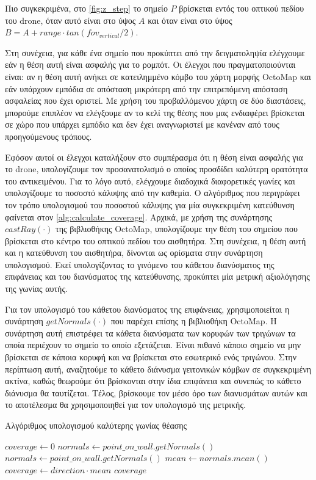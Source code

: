 Πιο συγκεκριμένα, στο \autoref{fig:z_step} το σημείο $P$ βρίσκεται εντός του οπτικού πεδίου του drone, όταν αυτό είναι στο ύψος $A$ και όταν είναι στο ύψος $B = A + range \cdot tan(fov_{vertical}/2)$. 

Στη συνέχεια, για κάθε ένα σημείο που προκύπτει από την δειγματοληψία ελέγχουμε εάν η θέση αυτή είναι ασφαλής για το ρομπότ. Οι έλεγχοι που πραγματοποιούνται είναι: αν η θέση αυτή ανήκει σε κατειλημμένο κόμβο του χάρτη μορφής OctoMap και εάν υπάρχουν εμπόδια σε απόσταση μικρότερη από την επιτρεπόμενη απόσταση ασφαλείας που έχει οριστεί. Με χρήση του προβαλλόμενου χάρτη σε δύο διαστάσεις, μπορούμε επιπλέον να ελέγξουμε αν το κελί της θέσης που μας ενδιαφέρει βρίσκεται σε χώρο που υπάρχει εμπόδιο και δεν έχει αναγνωριστεί με κανέναν από τους προηγούμενους τρόπους.

Εφόσον αυτοί οι έλεγχοι καταλήξουν στο συμπέρασμα ότι η θέση είναι ασφαλής για το drone, υπολογίζουμε τον προσανατολισμό ο οποίος προσδίδει καλύτερη ορατότητα του αντικειμένου. Για το λόγο αυτό, ελέγχουμε διαδοχικά διαφορετικές γωνίες και υπολογίζουμε το ποσοστό κάλυψης από την καθεμία. Ο αλγόριθμος που περιγράφει τον τρόπο υπολογισμού του ποσοστού κάλυψης για μία συγκεκριμένη κατεύθυνση φαίνεται στον \autoref{alg:calculate_coverage}. Αρχικά, με χρήση της συνάρτησης $castRay(\cdot)$ της βιβλιοθήκης OctoMap, υπολογίζουμε την θέση του σημείου που βρίσκεται στο κέντρο του οπτικού πεδίου του αισθητήρα. Στη συνέχεια, η θέση αυτή και η κατεύθυνση του αισθητήρα, δίνονται ως ορίσματα στην συνάρτηση υπολογισμού. Εκεί υπολογίζοντας το γινόμενο του κάθετου διανύσματος της επιφάνειας και του διανύσματος της κατεύθυνσης, προκύπτει μία μετρική αξιολόγησης της γωνίας αυτής. 

Για τον υπολογισμό του κάθετου διανύσματος της επιφάνειας, χρησιμοποιείται η συνάρτηση $getNormals(\cdot)$ που παρέχει επίσης η βιβλιοθήκη OctoMap. Η συνάρτηση αυτή επιστρέφει τα κάθετα διανύσματα των κορυφών των τριγώνων τα οποία περιέχουν το σημείο το οποίο εξετάζεται. Είναι πιθανό κάποιο σημείο να μην βρίσκεται σε κάποια κορυφή και να βρίσκεται στο εσωτερικό ενός τριγώνου. Στην περίπτωση αυτή, αναζητούμε το κάθετο διάνυσμα γειτονικών κόμβων σε συγκεκριμένη ακτίνα, καθώς θεωρούμε ότι βρίσκονται στην ίδια επιφάνεια και συνεπώς το κάθετο διάνυσμα θα ταυτίζεται. Τέλος, βρίσκουμε τον μέσο όρο των διανυσμάτων αυτών και το αποτέλεσμα θα χρησιμοποιηθεί για τον υπολογισμό της μετρικής.

\begin{algorithm}[!ht]
 \caption{Αλγόριθμος υπολογισμού καλύτερης γωνίας θέασης}
 \label{alg:calculate_coverage}
 \begin{algorithmic}[1]
        \State $coverage \gets 0$
        \State $normals \gets point\_on\_wall.getNormals()$
            \State $normals \gets point\_on\_wall.getNormals()$ 
        \EndWhile
        \State $mean \gets normals.mean()$
        \State $coverage \gets direction \cdot mean$
        \State \Return $coverage$
    \EndFunction 
    \end{algorithmic}
\end{algorithm}

